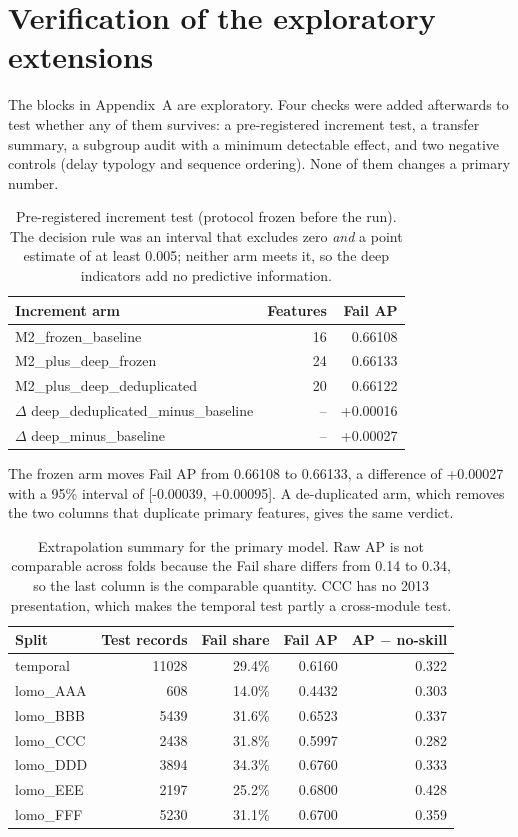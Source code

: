 \documentclass[11pt]{article}
\begin{document}
\section{Verification of the exploratory extensions}
The blocks in Appendix~A are exploratory. Four checks were added afterwards to test whether any of them survives: a pre-registered increment test, a transfer summary, a subgroup audit with a minimum detectable effect, and two negative controls (delay typology and sequence ordering). None of them changes a primary number.
\begin{table}[t]
\centering
\footnotesize
\begin{tabular}{lrr}
\toprule
Increment arm & Features & Fail AP \\
\midrule
M2\_frozen\_baseline & 16 & 0.66108 \\
M2\_plus\_deep\_frozen & 24 & 0.66133 \\
M2\_plus\_deep\_deduplicated & 20 & 0.66122 \\
$\Delta$ deep\_deduplicated\_minus\_baseline & -- & +0.00016 \\
$\Delta$ deep\_minus\_baseline & -- & +0.00027 \\
\bottomrule
\end{tabular}
\caption{Pre-registered increment test (protocol frozen before the run). The decision rule was an interval that excludes zero \emph{and} a point estimate of at least 0.005; neither arm meets it, so the deep indicators add no predictive information.}
\label{tab:v1}
\end{table}
The frozen arm moves Fail AP from 0.66108 to 0.66133, a difference of +0.00027 with a 95\% interval of [-0.00039, +0.00095]. A de-duplicated arm, which removes the two columns that duplicate primary features, gives the same verdict.
\begin{table}[t]
\centering
\scriptsize
\begin{tabular}{lrrrr}
\toprule
Split & Test records & Fail share & Fail AP & AP $-$ no-skill \\
\midrule
temporal & 11028 & 29.4\% & 0.6160 & 0.322 \\
lomo\_AAA & 608 & 14.0\% & 0.4432 & 0.303 \\
lomo\_BBB & 5439 & 31.6\% & 0.6523 & 0.337 \\
lomo\_CCC & 2438 & 31.8\% & 0.5997 & 0.282 \\
lomo\_DDD & 3894 & 34.3\% & 0.6760 & 0.333 \\
lomo\_EEE & 2197 & 25.2\% & 0.6800 & 0.428 \\
lomo\_FFF & 5230 & 31.1\% & 0.6700 & 0.359 \\
\bottomrule
\end{tabular}
\caption{Extrapolation summary for the primary model. Raw AP is not comparable across folds because the Fail share differs from 0.14 to 0.34, so the last column is the comparable quantity. CCC has no 2013 presentation, which makes the temporal test partly a cross-module test.}
\label{tab:v2}
\end{table}
\end{document}
